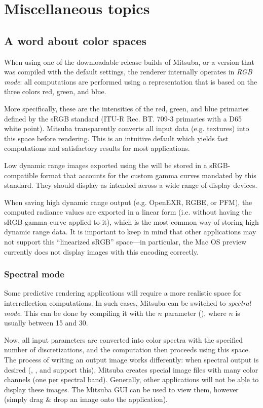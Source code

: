 \section{Miscellaneous topics}
\label{sec:miscellaneous}
\subsection{A word about color spaces}
\label{sec:colorspaces}
When using one of the downloadable release builds of Mitsuba, or a version 
that was compiled with the default settings, the renderer internally
operates in \emph{RGB mode}: all computations are performed using a representation 
that is based on the three colors red, green, and blue.

More specifically, these are the intensities of the red, green, and blue primaries
defined by the sRGB standard (ITU-R Rec. BT. 709-3 primaries with a D65 white point).
Mitsuba transparently converts all input data (e.g. textures) into this space before
rendering. This is an intuitive default which yields fast computations and
satisfactory results for most applications.

Low dynamic range images exported using the  will be stored in a
sRGB-compatible format that accounts for the custom gamma curves mandated by this 
standard. They should display as intended across a wide range of display devices.

When saving high dynamic range output (e.g. OpenEXR, RGBE, or PFM), the computed radiance
values are exported in a linear form (i.e. without having the sRGB gamma curve applied to it),
which is the most common way of storing high dynamic range data.
It is important to keep in mind that other applications may not support this 
``linearized sRGB'' space---in particular, the Mac OS preview currently
does not display images with this encoding correctly.

\subsubsection{Spectral mode}
Some predictive rendering applications will require a more realistic space for
interreflection computations. In such cases, Mitsuba can be switched to \emph{spectral mode}.
This can be done by compiling it with the $n$ parameter 
(), where $n$ is usually between 15 and 30.

Now, all input parameters are converted into color spectra with the specified
number of discretizations, and the computation then proceeds using this space.
The process of writing an output image works differently: when spectral output
is desired (, , and 
support this), Mitsuba creates special image files with many color channels (one
per spectral band).
Generally, other applications will not be able to display these images. The Mitsuba GUI
can be used to view them, however (simply drag \& drop an image onto the application).

